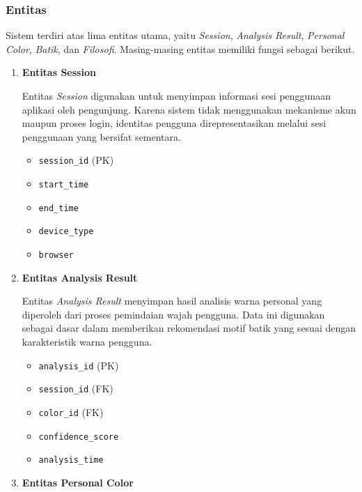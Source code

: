     \subsubsection{Entitas}
    \label{subsubsec:entitas}
    Sistem terdiri atas lima entitas utama, yaitu \textit{Session}, \textit{Analysis Result}, \textit{Personal Color}, \textit{Batik}, dan \textit{Filosofi}. Masing-masing entitas memiliki fungsi sebagai berikut.
    
    \begin{enumerate}
        \item \textbf{Entitas Session}
    
        Entitas \textit{Session} digunakan untuk menyimpan informasi sesi penggunaan aplikasi oleh pengunjung. Karena sistem tidak menggunakan mekanisme akun maupun proses login, identitas pengguna direpresentasikan melalui sesi penggunaan yang bersifat sementara.
    
        \begin{itemize}
            \item \texttt{session\_id} (PK)
            \item \texttt{start\_time}
            \item \texttt{end\_time}
            \item \texttt{device\_type}
            \item \texttt{browser}
        \end{itemize}
    
        \item \textbf{Entitas Analysis Result}
    
        Entitas \textit{Analysis Result} menyimpan hasil analisis warna personal yang diperoleh dari proses pemindaian wajah pengguna. Data ini digunakan sebagai dasar dalam memberikan rekomendasi motif batik yang sesuai dengan karakteristik warna pengguna.
    
        \begin{itemize}
            \item \texttt{analysis\_id} (PK)
            \item \texttt{session\_id} (FK)
            \item \texttt{color\_id} (FK)
            \item \texttt{confidence\_score}
            \item \texttt{analysis\_time}
        \end{itemize}
    
        \item \textbf{Entitas Personal Color}
    

\end{enumerate}
